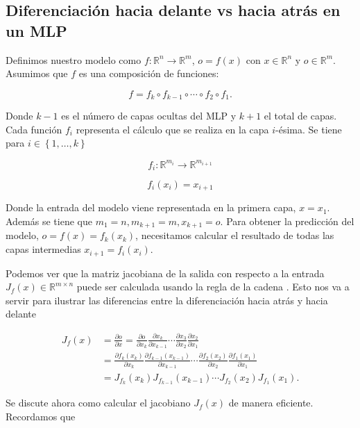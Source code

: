 \subsection{Diferenciación hacia delante vs hacia atrás en un MLP}


Definimos nuestro modelo como $f: \mathbb{R}^n \rightarrow \mathbb{R}^m$, $o=f(x)$ con $x \in \mathbb{R}^n$  y $o \in \mathbb{R}^m$. Asumimos que $f$ es una composición de funciones:

$$f=f_k \circ f_{k-1} \circ \cdots \circ f_2 \circ f_1.$$

Donde $k-1$ es el número de capas ocultas del MLP y $k+1$ el total de capas. Cada función $f_i$ representa el cálculo que se realiza en la capa $i$-ésima. Se tiene para $i \in \left \{ 1,\ldots,k \right \}$


$$f_i: \mathbb{R}^{m_i} \rightarrow \mathbb{R}^{m_{i+1}}$$

$$f_i(x_i)=x_{i+1}$$

Donde la entrada del modelo viene representada en la primera capa, $x=x_1$. Además se tiene que $m_1=n, m_{k+1}=m, x_{k+1}=o$. Para obtener la predicción del modelo, $o=f(x)=f_k(x_k)$, necesitamos calcular el resultado de todas las capas intermedias $x_{i+1}=f_i(x_i)$. 

Podemos ver que la matriz jacobiana de la salida con respecto a la entrada $J_f(x) \in  \mathbb{R}^{m\times n}$ puede ser calculada usando la regla de la cadena . Esto nos va a servir para ilustrar las diferencias entre la diferenciación hacia atrás y hacia delante


\begin{align*}
	J_f(x) &= \frac{\partial o}{\partial x} = \frac{\partial o}{\partial x_k} \frac{\partial x_k}{\partial x_{k-1}} \cdots \frac{\partial x_3}{\partial x_2} \frac{\partial x_2}{\partial x_1} \\	
	&=\frac{\partial f_k(x_k)}{\partial x_k} \frac{\partial f_{k-1}(x_{k-1})}{\partial x_{k-1}} \cdots \frac{\partial f_2(x_2)}{\partial x_2} \frac{\partial f_1(x_1)}{\partial x_1} \\	
	&= J_{f_k}(x_k) J_{f_{k-1}}(x_{k-1}) \cdots J_{f_2}(x_2) J_{f_1}(x_1).
\end{align*}

Se discute ahora como calcular el jacobiano $J_f(x)$ de manera eficiente. Recordamos que 

